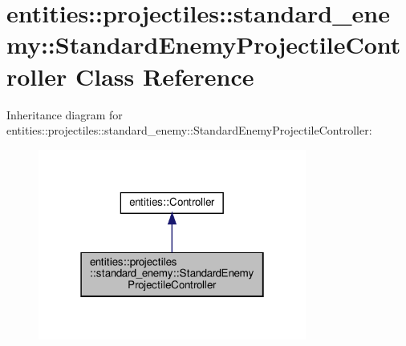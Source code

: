 \hypertarget{classentities_1_1projectiles_1_1standard__enemy_1_1StandardEnemyProjectileController}{}\section{entities\+:\+:projectiles\+:\+:standard\+\_\+enemy\+:\+:Standard\+Enemy\+Projectile\+Controller Class Reference}
\label{classentities_1_1projectiles_1_1standard__enemy_1_1StandardEnemyProjectileController}


Inheritance diagram for entities\+:\+:projectiles\+:\+:standard\+\_\+enemy\+:\+:Standard\+Enemy\+Projectile\+Controller\+:\nopagebreak
\begin{figure}[H]
\begin{center}
\leavevmode
\includegraphics[width=250pt]{classentities_1_1projectiles_1_1standard__enemy_1_1StandardEnemyProjectileController__inherit__graph}
\end{center}
\end{figure}


